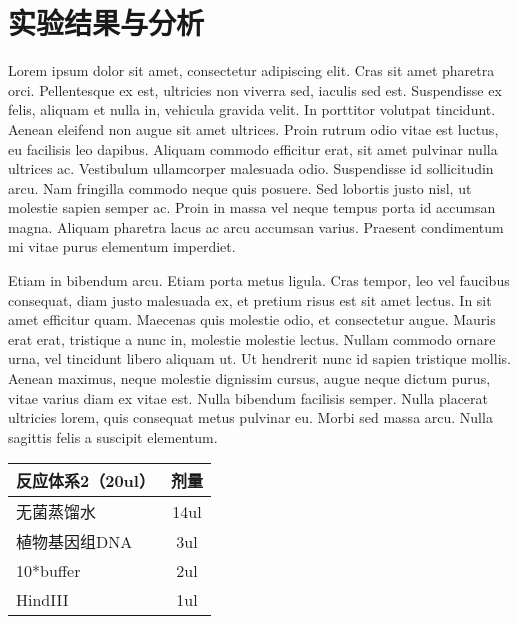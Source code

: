 \documentclass{xjtureport}
\begin{document}
\section{实验结果与分析}

Lorem ipsum dolor sit amet, consectetur adipiscing elit. Cras sit amet pharetra orci. Pellentesque ex est, ultricies non viverra sed, iaculis sed est. Suspendisse ex felis, aliquam et nulla in, vehicula gravida velit. In porttitor volutpat tincidunt. Aenean eleifend non augue sit amet ultrices. Proin rutrum odio vitae est luctus, eu facilisis leo dapibus. Aliquam commodo efficitur erat, sit amet pulvinar nulla ultrices ac. Vestibulum ullamcorper malesuada odio. Suspendisse id sollicitudin arcu. Nam fringilla commodo neque quis posuere. Sed lobortis justo nisl, ut molestie sapien semper ac. Proin in massa vel neque tempus porta id accumsan magna. Aliquam pharetra lacus ac arcu accumsan varius. Praesent condimentum mi vitae purus elementum imperdiet.

Etiam in bibendum arcu. Etiam porta metus ligula. Cras tempor, leo vel faucibus consequat, diam justo malesuada ex, et pretium risus est sit amet lectus. In sit amet efficitur quam. Maecenas quis molestie odio, et consectetur augue. Mauris erat erat, tristique a nunc in, molestie molestie lectus. Nullam commodo ornare urna, vel tincidunt libero aliquam ut. Ut hendrerit nunc id sapien tristique mollis. Aenean maximus, neque molestie dignissim cursus, augue neque dictum purus, vitae varius diam ex vitae est. Nulla bibendum facilisis semper. Nulla placerat ultricies lorem, quis consequat metus pulvinar eu. Morbi sed massa arcu. Nulla sagittis felis a suscipit elementum.

\begin{center}
    \begin{tabular}{lc}
        \toprule
        反应体系2（20ul） & 剂量 \\
        \midrule
        无菌蒸馏水        & 14ul \\
        植物基因组DNA     & 3ul  \\
        10*buffer         & 2ul  \\
        HindIII           & 1ul  \\
        \bottomrule
    \end{tabular}
\end{center}
\end{document}
